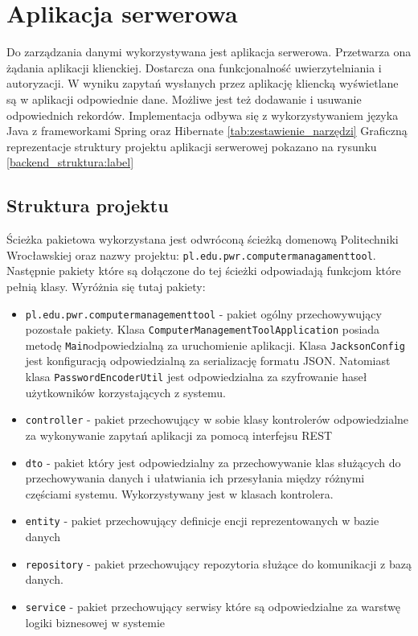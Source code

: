 \section{Aplikacja serwerowa}
Do zarządzania danymi wykorzystywana jest aplikacja serwerowa. Przetwarza ona żądania aplikacji klienckiej. Dostarcza ona funkcjonalność uwierzytelniania i autoryzacji. W wyniku zapytań wysłanych przez aplikację kliencką wyświetlane są w aplikacji odpowiednie dane. Możliwe jest też dodawanie i usuwanie odpowiednich rekordów. Implementacja odbywa się z wykorzystywaniem języka Java z frameworkami Spring oraz Hibernate \ref{tab:zestawienie_narzędzi} Graficzną reprezentacje struktury projektu aplikacji serwerowej pokazano na rysunku \ref{backend_struktura:label}

\subsection{Struktura projektu}
Ścieżka pakietowa wykorzystana jest odwróconą ścieżką domenową Politechniki Wrocławskiej oraz nazwy projektu: \texttt{pl.edu.pwr.computermanagamenttool}. Następnie pakiety które są dołączone do tej ścieżki odpowiadają funkcjom które pełnią klasy. Wyróżnia się tutaj pakiety:
\begin{itemize}
\item \texttt{pl.edu.pwr.computermanagementtool} - pakiet ogólny przechowywujący pozostałe pakiety. Klasa \texttt{ComputerManagementToolApplication} posiada metodę \texttt{Main}odpowiedzialną za uruchomienie aplikacji. Klasa \texttt{JacksonConfig} jest konfiguracją odpowiedzialną za serializację formatu JSON. Natomiast klasa \texttt{PasswordEncoderUtil} jest odpowiedzialna za szyfrowanie haseł użytkowników korzystających z systemu.
\item \texttt{controller} - pakiet przechowujący w sobie klasy kontrolerów odpowiedzialne za wykonywanie zapytań aplikacji za pomocą interfejsu REST
\item \texttt{dto} - pakiet który jest odpowiedzialny za przechowywanie klas służących do przechowywania danych i ułatwiania ich przesyłania między różnymi częściami systemu. Wykorzystywany jest w klasach kontrolera.
\item \texttt{entity} - pakiet przechowujący definicje encji reprezentowanych w bazie danych
\item \texttt{repository} - pakiet przechowujący repozytoria służące do komunikacji z bazą danych.
\item \texttt{service} - pakiet przechowujący serwisy które są odpowiedzialne za warstwę logiki biznesowej w systemie
\end{itemize}


